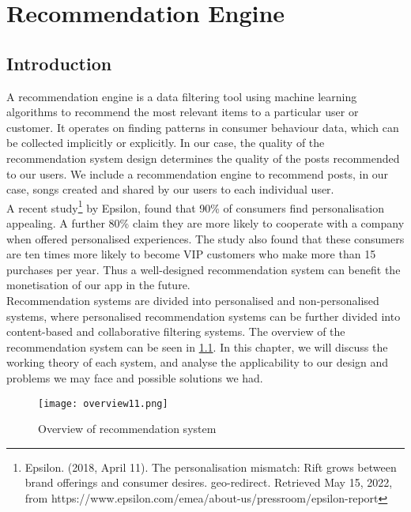 

\chapter{Recommendation Engine}%
\label{Chapter6} %

\section{Introduction}
A recommendation engine is a data filtering tool using machine learning algorithms to recommend the most relevant items to a particular user or customer. It operates on finding patterns in consumer behaviour data, which can be collected implicitly or explicitly. In our case, the quality of the recommendation system design determines the quality of the posts recommended to our users. We include a recommendation engine to recommend posts, in our case, songs created and shared by our users to each individual user.
\\A recent study\footnote{Epsilon. (2018, April 11). The personalisation mismatch: Rift grows between brand offerings and consumer desires. geo-redirect. Retrieved May 15, 2022, from https://www.epsilon.com/emea/about-us/pressroom/epsilon-report } by Epsilon, found that 90\% of consumers find personalisation appealing. A further 80\% claim they are more likely to cooperate with a company when offered personalised experiences.
The study also found that these consumers are ten times more likely to become VIP customers who make more than 15 purchases per year.
Thus a well-designed recommendation system can benefit the monetisation of our app in the future.
\\Recommendation systems are divided into personalised and non-personalised systems, where personalised recommendation systems can be further divided into content-based and collaborative filtering systems. 
The overview of the recommendation system can be seen in \cref{fig:overrecomm}. In this chapter, we will discuss the working theory of each system, and analyse the applicability to our design and problems we may face and possible solutions we had.
\begin{figure}[ht]
\centering
\texttt{[image: overview11.png]}
\caption{Overview of recommendation system}
\label{fig:overrecomm}
\end{figure}

